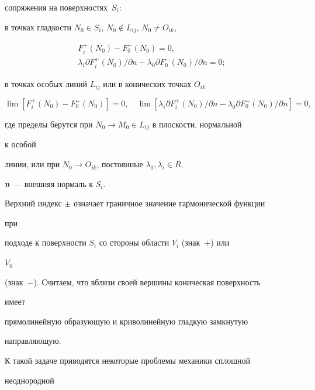 сопряжения на поверхностях~$S_i$: 


 


в точках гладкости $N_0\in S_i$, $N_0\notin L_{i j}$, $N_0\ne O_{i k}$, 


\begin{gather} 


F^+_i(N_0)-F^-_0(N_0)=0,\\ 


\lambda_i\partial F^+_i(N_0)/\partial n- 


\lambda_0\partial F^-_0(N_0)/\partial n=0; 


\end{gather} 


 


в точках особых линий $L_{i j}$ или в конических точках $O_{i k}$ 


\begin{equation} 


\lim[F^+_i(N_0)-F^-_0(N_0)]=0,\quad 


\lim[\lambda_i\partial F^+_i(N_0)/\partial n-\lambda_0 


\partial F^-_0(N_0)/\partial n]=0, 


\end{equation} 


где пределы берутся при $N_0\to M_0\in L_{i j}$ в плоскости, нормальной 


к особой 


линии, или при $N_0\to O_{i k}$, постоянные $\lambda_0,\lambda_i\in R$, 


$\bold n$ --- внешняя нормаль к $S_i$. 


Верхний индекс $\pm$ означает граничное значение гармонической функции 


при  


подходе к поверхности $S_i$ со стороны области $V_i$ (знак~$+$) или 


$V_0$ 


(знак~$-$). Считаем, что вблизи своей вершины коническая поверхность 


имеет  


прямолинейную образующую и криволинейную гладкую замкнутую  


направляющую. 


 


К такой задаче приводятся некоторые проблемы механики сплошной 


неоднородной  


